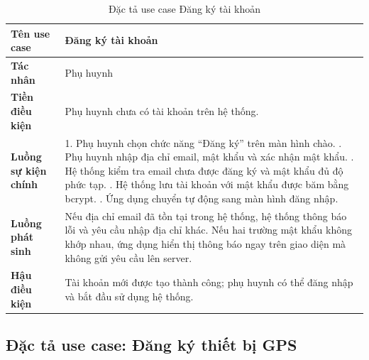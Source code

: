 \documentclass[../DoAn.tex]{subfiles}
\begin{document}
\begin{table}[H]
\centering
\caption{Đặc tả use case Đăng ký tài khoản}
\label{table:uc_register}
\begin{tabular}{|l|p{9.5cm}|}
\hline
\textbf{Tên use case}       & Đăng ký tài khoản \\
\hline
\textbf{Tác nhân}           & Phụ huynh \\
\hline
\textbf{Tiền điều kiện}     & Phụ huynh chưa có tài khoản trên hệ thống. \\
\hline
\textbf{Luồng sự kiện chính} &
1. Phụ huynh chọn chức năng ``Đăng ký'' trên màn hình chào. \newline
2. Phụ huynh nhập địa chỉ email, mật khẩu và xác nhận mật khẩu. \newline
3. Hệ thống kiểm tra email chưa được đăng ký và mật khẩu đủ độ phức tạp. \newline
4. Hệ thống lưu tài khoản với mật khẩu được băm bằng bcrypt. \newline
5. Ứng dụng chuyển tự động sang màn hình đăng nhập. \\
\hline
\textbf{Luồng phát sinh}    & Nếu địa chỉ email đã tồn tại trong hệ thống, hệ thống thông báo lỗi và yêu cầu nhập địa chỉ khác. Nếu hai trường mật khẩu không khớp nhau, ứng dụng hiển thị thông báo ngay trên giao diện mà không gửi yêu cầu lên server. \\
\hline
\textbf{Hậu điều kiện}      & Tài khoản mới được tạo thành công; phụ huynh có thể đăng nhập và bắt đầu sử dụng hệ thống. \\
\hline
\end{tabular}
\end{table}

\subsection{Đặc tả use case: Đăng ký thiết bị GPS}
\end{document}
